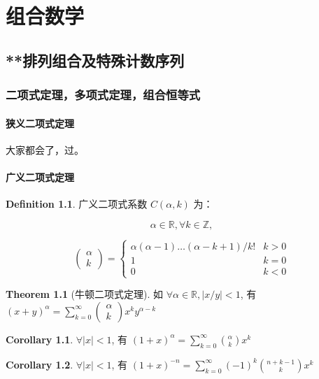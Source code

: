 \documentclass[oneside]{book}
\theoremstyle{definition}
\newtheorem{definition}{Definition}[section]
\newtheorem{theorem}{Theorem}[section]
\newtheorem{corollary}{Corollary}[section]
\begin{document}
\part{组合数学}	
	\chapter{**排列组合及特殊计数序列}
	
\section{二项式定理，多项式定理，组合恒等式}
\subsection{狭义二项式定理}
大家都会了，过。
\subsection{广义二项式定理}
\begin{definition}
	广义二项式系数 \( C(\alpha, k) \) 为：
	
	\[\alpha \in \mathbb{R}, \forall k \in \mathbb{Z},\]
	
	\[
	\begin{pmatrix}
		\alpha \\
		k
	\end{pmatrix} =
	\begin{cases}
		\alpha (\alpha - 1) \ldots (\alpha - k + 1) / k! & k > 0 \\
		1 & k = 0 \\
		0 & k < 0
	\end{cases}
	\]
\end{definition}
\begin{theorem}[牛顿二项式定理]
	如 \(\forall \alpha \in \mathbb{R}, |x/y| < 1\), 有 \((x + y)^\alpha = \sum_{k=0}^\infty \begin{pmatrix}
		\alpha \\
		k
	\end{pmatrix} x^k y^{\alpha - k}\)
\end{theorem}

\begin{corollary}
	\(\forall |x| < 1\), 有 \((1 + x)^{\alpha} = \sum_{k=0}^{\infty} \binom{\alpha}{k} x^k\)
\end{corollary}

\begin{corollary}
	\(\forall |x| < 1\), 有 \((1 + x)^{-n} = \sum_{k=0}^{\infty} (-1)^k \binom{n + k - 1}{k} x^k\)
\end{corollary}
\end{document}
